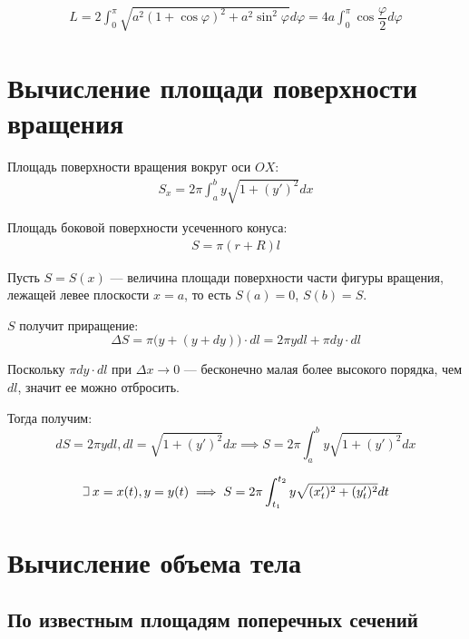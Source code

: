 \documentclass[a4paper,12pt,oneside]{extbook}
\def\lets{%
    \mathord{\setbox0=\hbox{$\exists$}%
        \hbox{\kern 0.125\wd0%
            \vbox to \ht0{%
                \hrule width 0.75\wd0%
                \vfill%
                \hrule width 0.75\wd0}%
            \vrule height \ht0%
            \kern 0.125\wd0}%
    }%
    \hspace{2pt}
}
\theoremstyle{numbered}
\theoremstyle{unnumbered}
\theoremstyle{named}
\theoremstyle{unnumbered}
\theoremstyle{named}
\theoremstyle{named}
\theoremstyle{named}
\begin{document}
\begin{gather*}
    L = 2 \int_0^\pi \sqrt{a^2(1 + \cos{\varphi})^2 + a^2\sin^2{\varphi}} d\varphi = 4a \int_0^\pi \cos{\dfrac{\varphi}{2}} d\varphi
\end{gather*}

\section{Вычисление площади поверхности вращения}%
\label{sec:Вычисление площади поверхности вращения}

Площадь поверхности вращения вокруг оси \(OX\):
\begin{gather*}
    S_x = 2\pi \int_a^b y\sqrt{1 + (y')^2}dx
\end{gather*}

Площадь боковой поверхности усеченного конуса:
\begin{gather*}
    S = \pi(r + R)l
\end{gather*}

Пусть \(S = S(x)\) — величина площади поверхности части фигуры вращения, лежащей левее плоскости \(x = a\), то есть \(S(a) = 0\), \(S(b) = S\).

\(S\) получит приращение:
\[
    \Delta S = \pi \Big(y + (y + dy)\Big) \cdot dl = 2\pi ydl + \pi dy \cdot dl
\]

Поскольку \(\pi dy \cdot dl\) при \(\Delta x \to 0\) — бесконечно малая более высокого порядка, чем \(dl\), значит ее можно отбросить.

Тогда получим:
\begin{equation}
    dS = 2\pi ydl, dl = \sqrt{1 + (y')^2}dx
    \implies
    S = 2\pi \int_a^b y\sqrt{1 + (y')^2}dx
\end{equation}

\begin{equation}
    \lets x = x(t), y = y(t) \implies S = 2\pi \int_{t_1}^{t_2} y\sqrt{(x'_t)^2 + (y'_t)^2}dt
\end{equation}


\section{Вычисление объема тела}%
\label{sec:Вычисление объема тела}

\subsection{По известным площадям поперечных сечений}%
\label{sub:По известным площадям поперечных сечений}
\end{document}

